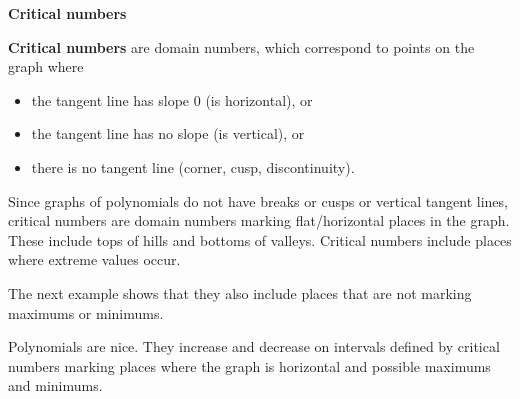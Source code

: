 \documentclass{ximera}
\begin{document}
\begin{idea} \item \textbf{\textcolor{blue!55!black}{Critical numbers}}

\textbf{Critical numbers} are domain numbers, which correspond to points on the graph where 

\begin{itemize}
\item the tangent line has slope $0$ (is horizontal), or 
\item the tangent line has no slope (is vertical), or
\item there is no tangent line (corner, cusp, discontinuity).
\end{itemize}


\end{idea}




Since graphs of polynomials do not have breaks or cusps or vertical tangent lines, critical numbers are domain numbers marking flat/horizontal places in the graph.  These include tops of hills and bottoms of valleys. Critical numbers include places where extreme values occur.


The next example shows that they also include places that are not marking maximums or minimums.


















Polynomials are nice.  They increase and decrease on intervals defined by critical numbers marking places where the graph is horizontal and possible maximums and minimums.
\end{document}
